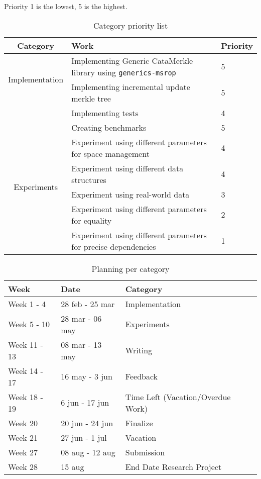 Priority 1 is the lowest, 5 is the highest.
\begin{table}[H]
    \setlength{\tabcolsep}{8pt}
    \centering
    \small
    \bigskip
    \begin{tabular}{|c|l|l|}
        \hline
        Category & Work & Priority \\
        \hline
        \multirow{2}{7em}{Implementation} & Implementing Generic CataMerkle library using \texttt{generics-msrop} & 5 \\
         & Implementing incremental update merkle tree & 5 \\
         & Implementing tests & 4 \\
        \hline
        \multirow{6}{7em}{Experiments} & Creating benchmarks & 5 \\
         & Experiment using different parameters for space management & 4 \\
         & Experiment using different data structures & 4 \\
         & Experiment using real-world data & 3 \\
         & Experiment using different parameters for equality & 2 \\
         & Experiment using different parameters for precise dependencies & 1 \\
        \hline
    \end{tabular}
\caption{Category priority list}
\label{table:priorities}
\end{table}

\begin{table}[H]
\setlength{\tabcolsep}{8pt}
\centering
\small
\bigskip
\begin{tabular}{|l|l|l|}
    \hline
    Week & Date & Category \\
    \hline
    Week 1 - 4 & 28 feb - 25 mar & Implementation \\
    \hline
    Week 5 - 10 & 28 mar - 06 may & Experiments \\
    \hline
    Week 11 - 13 & 08 mar - 13 may & Writing \\
    \hline
    Week 14 - 17 & 16 may - 3 jun & Feedback \\
    \hline
    Week 18 - 19 & 6 jun - 17 jun & Time Left (Vacation/Overdue Work) \\
    \hline
    Week 20 & 20 jun - 24 jun & Finalize \\
    \hline
    Week 21 & 27 jun - 1 jul & Vacation \\
    \hline
    Week 27 & 08 aug - 12 aug & Submission \\
    \hline 
    Week 28 & 15 aug & End Date Research Project  \\
    \hline
\end{tabular}
\caption{Planning per category}
\label{table:planning}
\end{table}